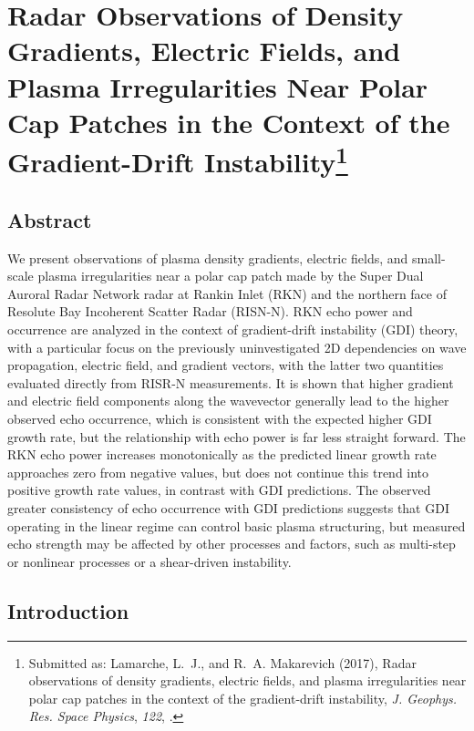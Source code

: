 \chapter[Radar Observations of Density Gradients, Electric Fields, and Plasma Irregularities Near Polar Cap Patches in the Context of the Gradient-Drift Instability]{Radar Observations of Density Gradients, Electric Fields, and Plasma Irregularities Near Polar Cap Patches in the Context of the Gradient-Drift Instability\footnote{Submitted as: {Lamarche}, L.~J., and R.~A. {Makarevich} (2017), Radar observations of density gradients, electric fields, and plasma irregularities near polar cap patches in the context of the gradient-drift instability, \textit{J. Geophys. Res. Space Physics}, \textit{122}, .}}

\label{sec:paper3}



\section*{Abstract}
We present observations of plasma density gradients, electric fields, and small-scale plasma irregularities near a polar cap patch made by the Super Dual Auroral Radar Network radar at Rankin Inlet (RKN) and the northern face of Resolute Bay Incoherent Scatter Radar (RISN-N). RKN echo power and occurrence are analyzed in the context of gradient-drift instability (GDI) theory, with a particular focus on the previously uninvestigated 2D dependencies on wave propagation, electric field, and gradient vectors, with the latter two quantities evaluated directly from RISR-N measurements. It is shown that higher gradient and electric field components along the wavevector generally lead to the higher observed echo occurrence, which is consistent with the expected higher GDI growth rate, but the relationship with echo power is far less straight forward. The RKN echo power increases monotonically as the predicted linear growth rate approaches zero from negative values, but does not continue this trend into positive growth rate values, in contrast with GDI predictions. The observed greater consistency of echo occurrence with GDI predictions suggests that GDI operating in the linear regime can control basic plasma structuring, but measured echo strength may be affected by other processes and factors, such as multi-step or nonlinear processes or a shear-driven instability.


\section{Introduction}
\label{sec:p3intro}

